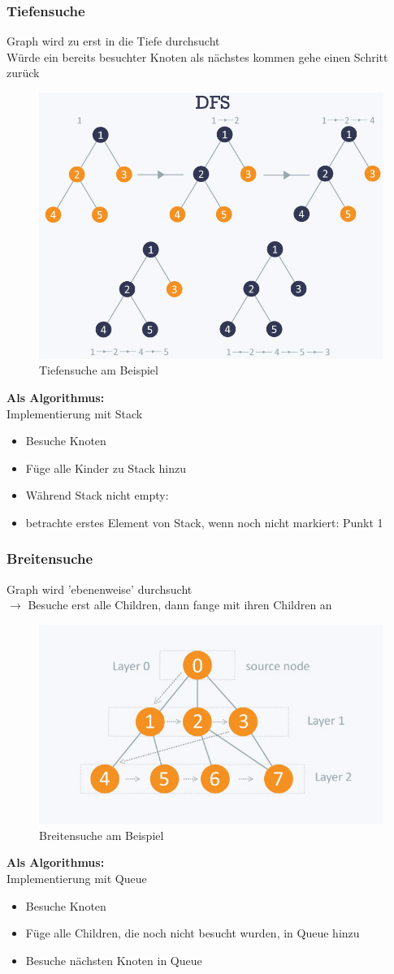 \documentclass{article}
\begin{document}
	\subsubsection{Tiefensuche}
	Graph wird zu erst in die Tiefe durchsucht
	\\Würde ein bereits besuchter Knoten als nächstes kommen gehe einen Schritt zurück
	\begin{figure}[H]
		\centering
		\includegraphics[width=0.7\linewidth]{Abbildungen/tiefensuche}
		\caption{Tiefensuche am Beispiel}
		\label{fig:tiefensuche}
	\end{figure}
	\textbf{Als Algorithmus:}
	\\Implementierung mit Stack
	\begin{itemize}
	\item Besuche Knoten
	\item Füge alle Kinder zu Stack hinzu
	\item Während Stack nicht empty:
	\item betrachte erstes Element von Stack, wenn noch nicht markiert: Punkt 1
	\end{itemize}

	\subsubsection{Breitensuche}
	Graph wird 'ebenenweise' durchsucht
	\\$\rightarrow$ Besuche erst alle Children, dann fange mit ihren Children an
\begin{figure}[H]
	\centering
	\includegraphics[width=0.5\linewidth]{Abbildungen/breitensuche}
	\caption{Breitensuche am Beispiel}
	\label{fig:breitensuche}
\end{figure}
	\textbf{Als Algorithmus:}
	\\Implementierung mit Queue
	\begin{itemize}
		\item Besuche Knoten
		\item Füge alle Children, die noch nicht besucht wurden,  in Queue hinzu
		\item Besuche nächsten Knoten in Queue
	\end{itemize}
\end{document}
